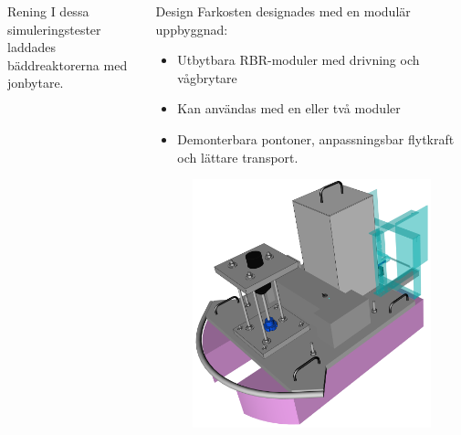 \documentclass[final]{beamer}
\newlength{\onecolwid}
\begin{document}
\begin{frame}[t]
\begin{columns}[t, totalwidth=\textwidth]
\begin{column}{\onecolwid}
\begin{block}{Rening}
        I dessa simuleringstester
        laddades bäddreaktorerna med jonbytare.

      \end{block}

    \end{column}

    \begin{column}{\onecolwid}

      \begin{block}{Design}
        Farkosten designades med en modulär uppbyggnad:
          \begin{itemize}
          \item Utbytbara RBR-moduler med drivning och vågbrytare
          \item Kan användas med en eller två moduler
          \item Demonterbara pontoner, anpassningsbar flytkraft och lättare transport.
          \end{itemize}

        \vskip 5cm
        \begin{figure}[H]
          \centering
          \hbox{\hspace{-4.5cm}\includegraphics[width=27cm]{figures/front_box_off.png}}
        \end{figure}


\end{block}
\end{column}
\end{columns}
\end{frame}
\end{document}
